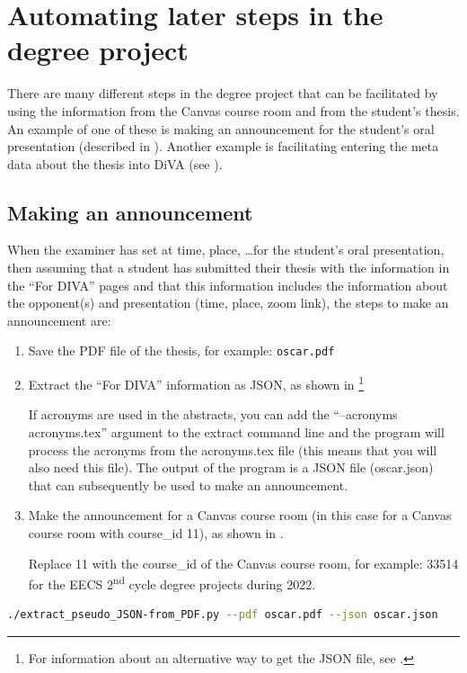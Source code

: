 \section{Automating later steps in the degree project}
\label{sec:AutomatingLaterSteps}
There are many different steps in the degree project that can be facilitated by using the information from the Canvas course room and from the student's thesis. An example of one of these is making an announcement for the student's oral presentation (described in ). Another example is facilitating entering the meta data about the thesis into DiVA (see ).

\subsection{Making an announcement}
\label{sec:makingAnAnnouncement}
When the examiner has set at time, place, \ldots for the student's oral presentation, then assuming that a student has submitted their thesis with the information in the “For DIVA” pages and that this information includes the information about the opponent(s) and presentation (\eg time, place, zoom link), the steps to make an announcement are:
\begin{enumerate}
    \item Save the PDF file of the thesis, for example: \texttt{oscar.pdf}
    \item Extract the “For DIVA” information as JSON, as shown in \footnote{For information about an alternative way to get the JSON file, see .}
    
    If acronyms are used in the abstracts, you can add the “--acronyms acronyms.tex” argument to the extract command line and the program will process the acronyms from the acronyms.tex file (this means that you will also need this file). The output of the program is a JSON file (oscar.json) that can subsequently be used to make an announcement.
    
    \item Make the announcement for a Canvas course room (in this case for a Canvas course room with course\_id 11), as shown in .
    
    Replace 11 with the course\_id of the Canvas course room, for example: 33514 for the EECS 2\textsuperscript{nd} cycle degree projects during 2022.
\end{enumerate}
\begin{lstlisting}[language={bash}, caption={extract\_pseudo\_JSON-from\_PDF.py for Oscar}, label=lst:extractPseudoJSONFromPDFforOscarFileToJSON]    
   ./extract_pseudo_JSON-from_PDF.py --pdf oscar.pdf --json oscar.json
\end{lstlisting}

